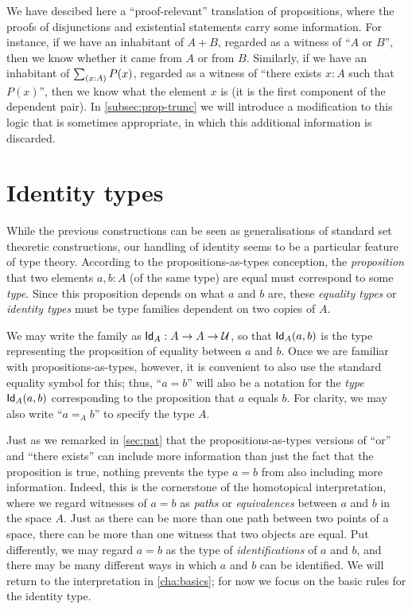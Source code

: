 We have descibed here a ``proof-relevant'' translation of propositions, where the proofs of disjunctions and existential statements carry some information.
For instance, if we have an inhabitant of $A+B$, regarded as a witness of ``$A$ or $B$'', then we know whether it came from $A$ or from $B$.
Similarly, if we have an inhabitant of $\sm{x:A} P(x)$, regarded as a witness of ``there exists $x:A$ such that $P(x)$'', then we know what the element $x$ is (it is the first component of the dependent pair).
In \autoref{subsec:prop-trunc} we will introduce a modification to this logic that is sometimes appropriate, in which this additional information is discarded.

\section{Identity types}
\label{sec:identity-types}

While the previous constructions can be seen as generalisations of
standard set theoretic constructions, our handling of  identity  seems to be
a particular feature of type theory.
According to the propositions-as-types conception, the \emph{proposition} that two elements $a,b:A$ (of the same type) are equal must correspond to some \emph{type}.
Since this proposition depends on what $a$ and $b$ are, these \emph{equality types} or \emph{identity types} must be type families dependent on two copies of $A$.

We may write the family as $\idtypevar{A}:A\to A\to\type$, so that $\idtype[A]ab$ is the type representing the proposition of equality between $a$ and $b$.
Once we are familiar with propositions-as-types, however, it is convenient to also use the standard equality symbol for this; thus, ``$a=b$'' will also be a notation for the \emph{type} $\idtype[A]ab$ corresponding to the proposition that $a$ equals $b$.
For clarity, we may also write ``$a=_A b$'' to specify the type $A$.

Just as we remarked in \autoref{sec:pat} that the propositions-as-types versions of ``or'' and ``there exists'' can include more information than just the fact that the proposition is true, nothing prevents the type $a=b$ from also including more information.
Indeed, this is the cornerstone of the homotopical interpretation, where we regard witnesses of $a=b$ as \emph{paths} or \emph{equivalences} between $a$ and $b$ in the space $A$.  Just as there can be more than one path between two points of a space, there can be more than one witness that two objects are equal.  Put differently, we may regard $a=b$ as the type of \emph{identifications} of $a$ and $b$, and there may be many different ways in which $a$ and $b$ can be identified.
We will return to the interpretation in \autoref{cha:basics}; for now we focus on the basic rules for the identity type.

